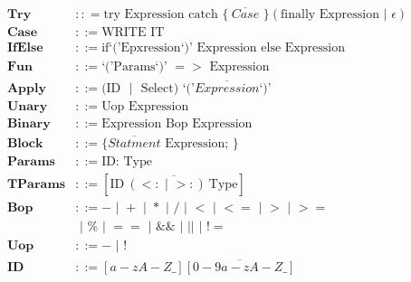 \documentclass[12pt]{article}
\newcommand\bnf{\,\,|\,\,}
\renewcommand\c[1]{\text{#1}}
\begin{document}
\begin{align*}
  \textbf{Try} & :: = \c{try Expression catch \{}~\overline{Case} \c{ \} }
      (\c{finally Expression} \bnf \epsilon) \\
  \textbf{Case} & ::= \c{WRITE IT} \\
  \textbf{IfElse} & ::= \c{if`('Epxression`)' Expression else Expression} \\
  \textbf{Fun} & ::= \c{`('Params`)' $=>$ Expression} \\
  \textbf{Apply} & ::= \c{(ID $\bnf$ Select) `('$\overline{Expression}$`)'} \\
  \textbf{Unary} & ::= \c{Uop Expression} \\
  \textbf{Binary} & ::= \c{Expression Bop Expression} \\
  \textbf{Block} & ::= \c{\{ $\overline{Statment}$ Expression; \}} \\
  \textbf{Params} & ::= \c{ID: Type} \\
  \textbf{TParams} & ::= [\overline{\c{ID}~(<: \bnf >:)~\c{Type}}] \\
  \textbf{Bop} & ::= - \bnf + \bnf * \bnf / \bnf < \bnf <= \bnf > \bnf >= \\
      & \bnf \% \bnf == \bnf \&\& \bnf \texttt{||} \bnf != \\
  \textbf{Uop} & ::= - \bnf ! \\
  \textbf{ID} & ::= [a-zA-Z\_]\overline{[0-9a-zA-Z\_]} \\
\end{align*}
\end{document}
